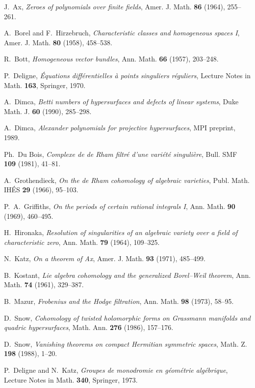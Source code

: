 \documentclass[11pt]{amsart}
\theoremstyle{definition}
\begin{document}
\begin{enumerate}[label={[\arabic*]}, leftmargin=2em, itemsep=2pt]
\item J.~Ax, \textit{Zeroes of polynomials over finite fields}, Amer. J. Math. \textbf{86} (1964), 255--261.
\item A.~Borel and F.~Hirzebruch, \textit{Characteristic classes and homogeneous spaces I}, Amer. J. Math. \textbf{80} (1958), 458--538.
\item R.~Bott, \textit{Homogeneous vector bundles}, Ann. Math. \textbf{66} (1957), 203--248.
\item P.~Deligne, \textit{\'Equations diff\'erentielles \`a points singuliers r\'eguliers}, Lecture Notes in Math. \textbf{163}, Springer, 1970.
\item A.~Dimca, \textit{Betti numbers of hypersurfaces and defects of linear systems}, Duke Math. J. \textbf{60} (1990), 285--298.
\item A.~Dimca, \textit{Alexander polynomials for projective hypersurfaces}, MPI preprint, 1989.
\item Ph.~Du Bois, \textit{Complexe de de Rham filtr\'e d'une vari\'et\'e singuli\`ere}, Bull. SMF \textbf{109} (1981), 41--81.
\item A.~Grothendieck, \textit{On the de Rham cohomology of algebraic varieties}, Publ. Math. IH\'ES \textbf{29} (1966), 95--103.
\item P.~A.~Griffiths, \textit{On the periods of certain rational integrals I}, Ann. Math. \textbf{90} (1969), 460--495.
\item H.~Hironaka, \textit{Resolution of singularities of an algebraic variety over a field of characteristic zero}, Ann. Math. \textbf{79} (1964), 109--325.
\item N.~Katz, \textit{On a theorem of Ax}, Amer. J. Math. \textbf{93} (1971), 485--499.
\item B.~Kostant, \textit{Lie algebra cohomology and the generalized Borel--Weil theorem}, Ann. Math. \textbf{74} (1961), 329--387.
\item B.~Mazur, \textit{Frobenius and the Hodge filtration}, Ann. Math. \textbf{98} (1973), 58--95.
\item D.~Snow, \textit{Cohomology of twisted holomorphic forms on Grassmann manifolds and quadric hypersurfaces}, Math. Ann. \textbf{276} (1986), 157--176.
\item D.~Snow, \textit{Vanishing theorems on compact Hermitian symmetric spaces}, Math. Z. \textbf{198} (1988), 1--20.
\item[{[SGA 7 (t.~2)]}] P.~Deligne and N.~Katz, \textit{Groupes de monodromie en g\'eom\'etrie alg\'ebrique}, Lecture Notes in Math. \textbf{340}, Springer, 1973.
\end{enumerate}
\end{document}
